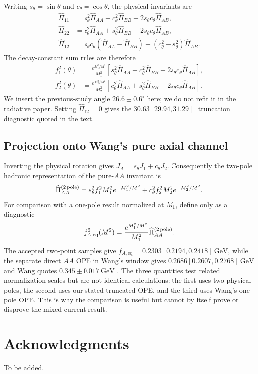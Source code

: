 \documentclass[11pt]{article}
\newcommand{\GeV}{\mathrm{GeV}}
\begin{document}
Writing $s_\theta=\sin\theta$ and $c_\theta=\cos\theta$, the physical
invariants are
\begin{align}
 \widehat\Pi_{11}&=s_\theta^2\widehat\Pi_{AA}
 +c_\theta^2\widehat\Pi_{BB}
 +2s_\theta c_\theta\widehat\Pi_{AB},\nonumber\\
 \widehat\Pi_{22}&=c_\theta^2\widehat\Pi_{AA}
 +s_\theta^2\widehat\Pi_{BB}
 -2s_\theta c_\theta\widehat\Pi_{AB},\nonumber\\
 \widehat\Pi_{12}&=s_\theta c_\theta
 (\widehat\Pi_{AA}-\widehat\Pi_{BB})
 +(c_\theta^2-s_\theta^2)\widehat\Pi_{AB}.
 \label{eq:app-rotated-pi}
\end{align}
The decay-constant sum rules are therefore
\begin{align}
 f_1^2(\theta)&=\frac{e^{M_1^2/M^2}}{M_1^2}
 [s_\theta^2\widehat\Pi_{AA}
 +c_\theta^2\widehat\Pi_{BB}
 +2s_\theta c_\theta\widehat\Pi_{AB}],\nonumber\\
 f_2^2(\theta)&=\frac{e^{M_2^2/M^2}}{M_2^2}
 [c_\theta^2\widehat\Pi_{AA}
 +s_\theta^2\widehat\Pi_{BB}
 -2s_\theta c_\theta\widehat\Pi_{AB}].
 \label{eq:app-decay-constants}
\end{align}
We insert the previous-study angle $26.6\pm0.6^\circ$
\cite{AlievBilmisSavci2024} here; we do not refit it in the radiative paper.
Setting $\widehat\Pi_{12}=0$ gives the
$30.63[29.94,31.29]^\circ$ truncation diagnostic quoted in the text.

\subsection{Projection onto Wang's pure axial channel}

Inverting the physical rotation gives $J_A=s_\theta J_1+c_\theta J_2$.
Consequently the two-pole hadronic representation of the pure-$AA$ invariant is
\begin{equation}
 \widehat\Pi_{AA}^{(2\,{\rm pole})}
 =s_\theta^2 f_1^2M_1^2e^{-M_1^2/M^2}
 +c_\theta^2 f_2^2M_2^2e^{-M_2^2/M^2}.
 \label{eq:app-aa-two-pole}
\end{equation}
For comparison with a one-pole result normalized at $M_1$, define only as a
diagnostic
\begin{equation}
 f_{A,\mathrm{eq}}^2(M^2)=
 \frac{e^{M_1^2/M^2}}{M_1^2}
 \widehat\Pi_{AA}^{(2\,{\rm pole})}.
 \label{eq:app-wang-projection}
\end{equation}
The accepted two-point samples give
$f_{A,\mathrm{eq}}=0.2303[0.2194,0.2418]~\GeV$, while the separate direct
$AA$ OPE in Wang's window gives
$0.2686[0.2607,0.2768]~\GeV$ and Wang quotes
$0.345\pm0.017~\GeV$ \cite{Wang2015}.  The three quantities test related
normalization scales but are not identical calculations: the first uses two
physical poles, the second uses our stated truncated OPE, and the third uses
Wang's one-pole OPE.  This is why the comparison is useful but cannot by itself
prove or disprove the mixed-current result.

\section*{Acknowledgments}

To be added.



\end{document}
